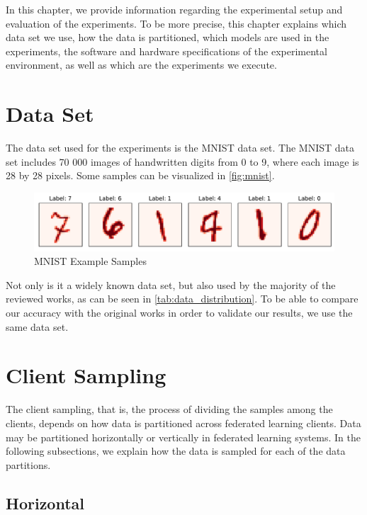 In this chapter, we provide information regarding the experimental setup and evaluation of the experiments. To be more precise, this chapter explains which data set we use, how the data is partitioned, which models are used in the experiments, the software and hardware specifications of the experimental environment, as well as which are the experiments we execute.

\section{Data Set}\label{eval:data_set}

The data set used for the experiments is the MNIST \cite{lecun2010mnist} data set. The MNIST data set includes 70 000 images of handwritten digits from 0 to 9, where each image is 28 by 28 pixels. Some samples can be visualized in \autoref{fig:mnist}.

\begin{figure}[!htp]
    \centering
    \centering
    \includegraphics[width=1\textwidth]{graphics/mnist.pdf}
    \caption{MNIST Example Samples}
    \label{fig:mnist}
\end{figure}

Not only is it a widely known data set, but also used by the majority of the reviewed works, as can be seen in \autoref{tab:data_distribution}. To be able to compare our accuracy with the original works in order to validate our results, we use the same data set.

\section{Client Sampling}\label{eval:client_sampling}

The client sampling, that is, the process of dividing the samples among the clients, depends on how data is partitioned across federated learning clients. Data may be partitioned horizontally or vertically in federated learning systems. In the following subsections, we explain how the data is sampled for each of the data partitions.

\subsection{Horizontal}


